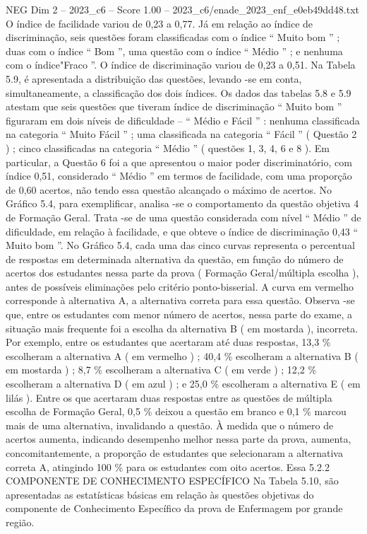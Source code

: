 \begin{textsample}{NEG Dim 2 – 2023\_c6 – Score 1.00 – 2023\_c6/enade\_2023\_enf\_e0eb49dd48.txt}
O índice de facilidade variou de 0,23 a 0,77.
Já em relação ao índice de discriminação, seis questões foram classificadas com o índice “ Muito bom ” ; duas com o índice “ Bom ”, uma questão com o índice “ Médio ” ; e nenhuma com o índice"Fraco ”.
O índice de discriminação variou de 0,23 a 0,51.
Na Tabela 5.9, é apresentada a distribuição das questões, levando -se em conta, simultaneamente, a classificação dos dois índices.
Os dados das tabelas 5.8 e 5.9 atestam que seis questões que tiveram índice de discriminação “ Muito bom ” figuraram em dois níveis de dificuldade – “ Médio e Fácil ” : nenhuma classificada na categoria “ Muito Fácil ” ; uma classificada na categoria “ Fácil ” ( Questão 2 ) ; cinco classificadas na categoria “ Médio ” ( questões 1, 3, 4, 6 e 8 ).
Em particular, a Questão 6 foi a que apresentou o maior poder discriminatório, com índice 0,51, considerado “ Médio ” em termos de facilidade, com uma proporção de 0,60 acertos, não tendo essa questão alcançado o máximo de acertos.
No Gráfico 5.4, para exemplificar, analisa -se o comportamento da questão objetiva 4 de Formação Geral.
Trata -se de uma questão considerada com nível “ Médio ” de dificuldade, em relação à facilidade, e que obteve o índice de discriminação 0,43 “ Muito bom ”.
No Gráfico 5.4, cada uma das cinco curvas representa o percentual de respostas em determinada alternativa da questão, em função do número de acertos dos estudantes nessa parte da prova ( Formação Geral/múltipla escolha ), antes de possíveis eliminações pelo critério ponto-bisserial.
A curva em vermelho corresponde à alternativa A, a alternativa correta para essa questão.
Observa -se que, entre os estudantes com menor número de acertos, nessa parte do exame, a situação mais frequente foi a escolha da alternativa B ( em mostarda ), incorreta.
Por exemplo, entre os estudantes que acertaram até duas respostas, 13,3 \% escolheram a alternativa A ( em vermelho ) ; 40,4 \% escolheram a alternativa B ( em mostarda ) ; 8,7 \% escolheram a alternativa C ( em verde ) ; 12,2 \% escolheram a alternativa D ( em azul ) ; e 25,0 \% escolheram a alternativa E ( em lilás ).
Entre os que acertaram duas respostas entre as questões de múltipla escolha de Formação Geral, 0,5 \% deixou a questão em branco e 0,1 \% marcou mais de uma alternativa, invalidando a questão.
À medida que o número de acertos aumenta, indicando desempenho melhor nessa parte da prova, aumenta, concomitantemente, a proporção de estudantes que selecionaram a alternativa correta A, atingindo 100 \% para os estudantes com oito acertos.
Essa 5.2.2 COMPONENTE DE CONHECIMENTO ESPECÍFICO Na Tabela 5.10, são apresentadas as estatísticas básicas em relação às questões objetivas do componente de Conhecimento Específico da prova de Enfermagem por grande região.

\end{textsample}
